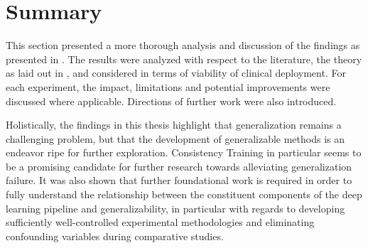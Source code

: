 \section{Summary}
This section presented a more thorough analysis and discussion of the findings as presented in . The results were analyzed with respect to the literature, the theory as laid out in , and considered in terms of viability of clinical deployment. For each experiment, the impact, limitations and potential improvements were discussed where applicable. Directions of further work were also introduced. 

Holistically, the findings in this thesis highlight that generalization remains a challenging problem, but that the development of generalizable methods is an endeavor ripe for further exploration. Consistency Training in particular seems to be a promising candidate for further research towards alleviating generalization failure. It was also shown that further foundational work is required in order to fully understand the relationship between the constituent components of the deep learning pipeline and generalizability, in particular with regards to developing sufficiently well-controlled experimental methodologies and eliminating confounding variables during comparative studies. 